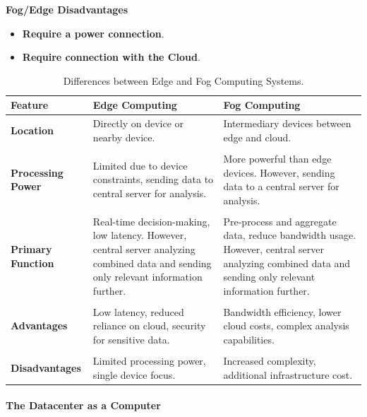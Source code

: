\begin{flushleft}
    \textcolor{Red2}{ \textbf{Fog/Edge Disadvantages}}
\end{flushleft}
\begin{itemize}
    \item \textbf{Require a power connection}.
    \item \textbf{Require connection with the Cloud}.
\end{itemize}

\newpage

\begin{table}[!htp]
    \centering
    \begin{tabular}{@{} l p{11.5em} p{11.5em} @{}}
        \toprule
        \textbf{Feature} & \textbf{Edge Computing} & \textbf{Fog Computing} \\
        \midrule
        \textbf{Location} & Directly on device or nearby device. & Intermediary devices between edge and cloud. \\
        \\
        \textbf{Processing Power} & Limited due to device constraints, sending data to central server for analysis. & More powerful than edge devices. However, sending data to a central server for analysis. \\
        \\
        \textbf{Primary Function} & Real-time decision-making, low latency. However, central server analyzing combined data and sending only relevant information further. & Pre-process and aggregate data, reduce bandwidth usage. However, central server analyzing combined data and sending only relevant information further. \\
        \\
        \textbf{Advantages} & Low latency, reduced reliance on cloud, security for sensitive data. & Bandwidth efficiency, lower cloud costs, complex analysis capabilities. \\
        \\
        \textbf{Disadvantages} & Limited processing power, single device focus. & Increased complexity, additional infrastructure cost. \\
        \bottomrule
    \end{tabular}
    \caption{Differences between Edge and Fog Computing Systems.}
\end{table}

\newpage

\paragraph{The Datacenter as a Computer}


